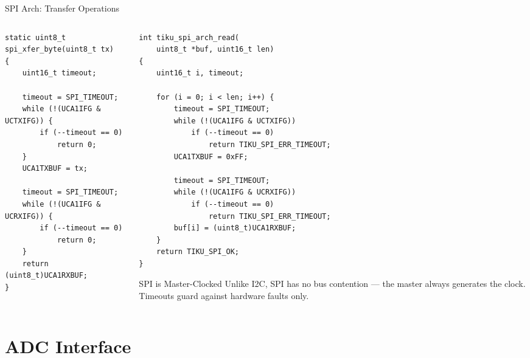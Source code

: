 \documentclass[aspectratio=169, 10pt]{beamer}
\begin{document}
\begin{frame}[fragile]{SPI Arch: Transfer Operations}
\begin{columns}[T]
\begin{column}{0.48\textwidth}
\begin{lstlisting}[style=cstyle, basicstyle=\ttfamily\tiny,
  title={Single-byte full-duplex exchange}]
static uint8_t spi_xfer_byte(uint8_t tx)
{
    uint16_t timeout;

    timeout = SPI_TIMEOUT;
    while (!(UCA1IFG & UCTXIFG)) {
        if (--timeout == 0)
            return 0;
    }
    UCA1TXBUF = tx;

    timeout = SPI_TIMEOUT;
    while (!(UCA1IFG & UCRXIFG)) {
        if (--timeout == 0)
            return 0;
    }
    return (uint8_t)UCA1RXBUF;
}
\end{lstlisting}
\end{column}

\begin{column}{0.48\textwidth}
\begin{lstlisting}[style=cstyle, basicstyle=\ttfamily\tiny,
  title={Bulk read (sends 0xFF dummy)}]
int tiku_spi_arch_read(
    uint8_t *buf, uint16_t len)
{
    uint16_t i, timeout;

    for (i = 0; i < len; i++) {
        timeout = SPI_TIMEOUT;
        while (!(UCA1IFG & UCTXIFG))
            if (--timeout == 0)
                return TIKU_SPI_ERR_TIMEOUT;
        UCA1TXBUF = 0xFF;

        timeout = SPI_TIMEOUT;
        while (!(UCA1IFG & UCRXIFG))
            if (--timeout == 0)
                return TIKU_SPI_ERR_TIMEOUT;
        buf[i] = (uint8_t)UCA1RXBUF;
    }
    return TIKU_SPI_OK;
}
\end{lstlisting}

\vspace{0.3em}
\begin{block}{SPI is Master-Clocked}
Unlike I2C, SPI has no bus contention ---
the master always generates the clock.
Timeouts guard against hardware faults only.
\end{block}
\end{column}
\end{columns}
\end{frame}

\section{ADC Interface}
\end{document}
